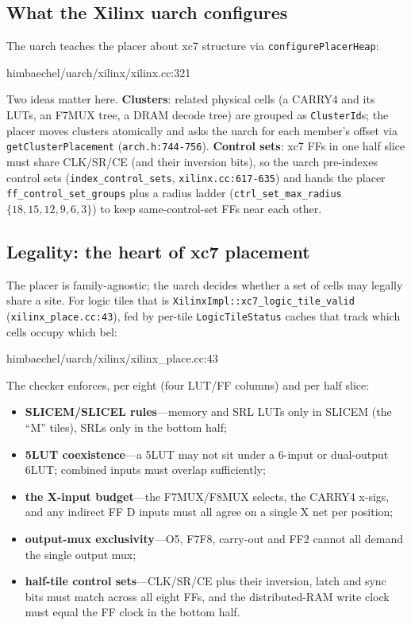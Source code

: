 \documentclass[11pt,a4paper]{article}
\begin{document}
\subsection{What the Xilinx uarch configures}

The uarch teaches the placer about xc7 structure via
\texttt{configurePlacerHeap}:

\begin{cppfile}{himbaechel/uarch/xilinx/xilinx.cc:321}
  
\end{cppfile}

Two ideas matter here. \textbf{Clusters}: related physical cells (a
CARRY4 and its LUTs, an F7MUX tree, a DRAM decode tree) are grouped as
\texttt{ClusterId}s; the placer moves clusters atomically and asks the
uarch for each member's offset via \texttt{getClusterPlacement}
(\texttt{arch.h:744-756}). \textbf{Control sets}: xc7 FFs in one half
slice must share CLK/SR/CE (and their inversion bits), so the uarch
pre-indexes control sets (\texttt{index\_control\_sets},
\texttt{xilinx.cc:617-635}) and hands the placer
\texttt{ff\_control\_set\_groups} plus a radius ladder
(\texttt{ctrl\_set\_max\_radius} $\{18,15,12,9,6,3\}$) to keep
same-control-set FFs near each other.

\subsection{Legality: the heart of xc7 placement}

The placer is family-agnostic; the uarch decides whether a set of cells
may legally share a site. For logic tiles that is
\texttt{XilinxImpl::xc7\_logic\_tile\_valid} (\texttt{xilinx\_place.cc:43}),
fed by per-tile \texttt{LogicTileStatus} caches that track which cells
occupy which bel:

\begin{cppfile}{himbaechel/uarch/xilinx/xilinx_place.cc:43}
  
\end{cppfile}

The checker enforces, per eight (four LUT/FF columns) and per half
slice:

\begin{itemize}
\item \textbf{SLICEM/SLICEL rules}---memory and SRL LUTs only in SLICEM
  (the ``M'' tiles), SRLs only in the bottom half;
\item \textbf{5LUT coexistence}---a 5LUT may not sit under a 6-input or
  dual-output 6LUT; combined inputs must overlap sufficiently;
\item \textbf{the X-input budget}---the F7MUX/F8MUX selects, the CARRY4
  x-sigs, and any indirect FF D inputs must all agree on a single X net
  per position;
\item \textbf{output-mux exclusivity}---O5, F7F8, carry-out and FF2
  cannot all demand the single output mux;
\item \textbf{half-tile control sets}---CLK/SR/CE plus their inversion,
  latch and sync bits must match across all eight FFs, and the
  distributed-RAM write clock must equal the FF clock in the bottom
  half.
\end{itemize}
\end{document}
